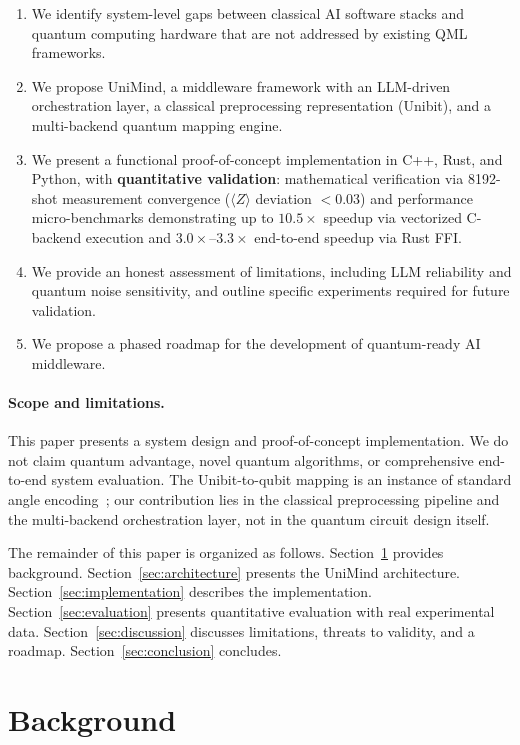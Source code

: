 ﻿\documentclass[12pt,a4paper]{article}
\begin{document}
\begin{enumerate}[leftmargin=2em]
    \item We identify system-level gaps between classical AI software stacks and quantum computing hardware that are not addressed by existing QML frameworks.
    \item We propose UniMind, a middleware framework with an LLM-driven orchestration layer, a classical preprocessing representation (Unibit), and a multi-backend quantum mapping engine.
    \item We present a functional proof-of-concept implementation in C++, Rust, and Python, with \textbf{quantitative validation}: mathematical verification via 8192-shot measurement convergence ($\langle Z \rangle$ deviation $< 0.03$) and performance micro-benchmarks demonstrating up to $10.5\times$ speedup via vectorized C-backend execution and $3.0\times$--$3.3\times$ end-to-end speedup via Rust FFI.
    \item We provide an honest assessment of limitations, including LLM reliability and quantum noise sensitivity, and outline specific experiments required for future validation.
    \item We propose a phased roadmap for the development of quantum-ready AI middleware.
\end{enumerate}

\paragraph{Scope and limitations.} This paper presents a system design and proof-of-concept implementation. We do not claim quantum advantage, novel quantum algorithms, or comprehensive end-to-end system evaluation. The Unibit-to-qubit mapping is an instance of standard angle encoding~\cite{schuld2021}; our contribution lies in the classical preprocessing pipeline and the multi-backend orchestration layer, not in the quantum circuit design itself.

The remainder of this paper is organized as follows. Section~\ref{sec:background} provides background. Section~\ref{sec:architecture} presents the UniMind architecture. Section~\ref{sec:implementation} describes the implementation. Section~\ref{sec:evaluation} presents quantitative evaluation with real experimental data. Section~\ref{sec:discussion} discusses limitations, threats to validity, and a roadmap. Section~\ref{sec:conclusion} concludes.


\section{Background}\label{sec:background}
\end{document}

